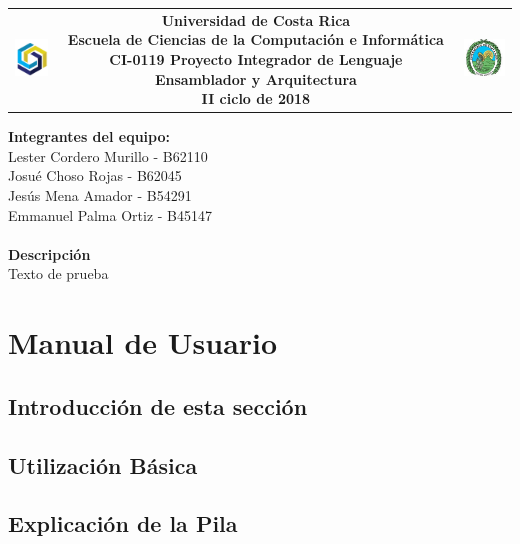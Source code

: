 \documentclass[12pt,letterpaper]{article}
\begin{document}
\begin{tabular}{ccc}
\includegraphics[width=12mm]{logo.png}& 
\parbox{6in}{ \centering 
                  \textbf{Universidad de Costa Rica\\
                      Escuela de Ciencias de la Computación e Informática\\
                      CI-0119 Proyecto Integrador de Lenguaje Ensamblador y Arquitectura\\
                      II ciclo de 2018}\\
                     \hrulefill
                 }  & 
\includegraphics[width=15mm]{UCR.jpg}\\
\end{tabular}
\newline
\newline
\newline
\textbf{Integrantes del equipo:}\\
Lester Cordero Murillo - B62110\\
Josué Choso Rojas - B62045\\
Jesús Mena Amador - B54291\\
Emmanuel Palma Ortiz - B45147\\
\\
\large \textbf{Descripción}\\
Texto de prueba\\

\newpage

\tableofcontents
\section{Manual de Usuario}
\subsection{Introducción de esta sección}
\subsection{Utilización Básica}
\subsection{Explicación de la Pila}
\end{document}
